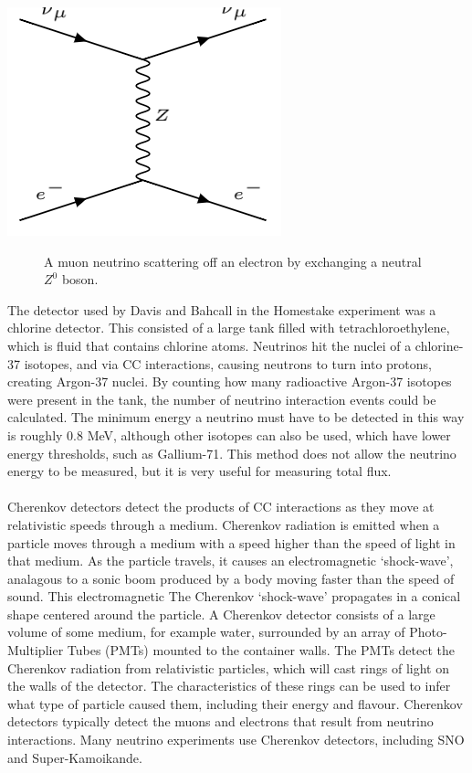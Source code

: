 \documentclass[12pt]{article}
\begin{document}
\begin{center}
\includegraphics[scale=0.4]{NC.png}
\begin{figure}[h!]
\caption{A muon neutrino scattering off an electron by exchanging a neutral $Z^0$ boson.}
\label{fig:NC}
\end{figure}
\end{center}
The detector used by Davis and Bahcall in the Homestake experiment was a chlorine detector. This consisted of a large tank filled with tetrachloroethylene, which is fluid that contains chlorine atoms. Neutrinos hit the nuclei of a chlorine-37 isotopes, and via CC interactions, causing neutrons to turn into protons, creating Argon-37 nuclei. By counting how many radioactive Argon-37 isotopes were present in the tank, the number of neutrino interaction events could be calculated\cite{Homestake}. The minimum energy a neutrino must have to be detected in this way is roughly 0.8 MeV, although other isotopes can also be used, which have lower energy thresholds, such as Gallium-71. This method does not allow the neutrino energy to be measured, but it is very useful for measuring total flux.\\\\
Cherenkov detectors detect the products of CC interactions as they move at relativistic speeds through a medium. Cherenkov radiation is emitted when a particle moves through a medium with a speed higher than the speed of light in that medium. As the particle travels, it causes an electromagnetic `shock-wave', analagous to a sonic boom produced by a body moving faster than the speed of sound. This electromagnetic The Cherenkov `shock-wave' propagates in a conical shape centered around the particle. A Cherenkov detector consists of a large volume of some medium, for example water, surrounded by an array of Photo-Multiplier Tubes (PMTs) mounted to the container walls. The PMTs detect the Cherenkov radiation from relativistic particles, which will cast rings of light on the walls of the detector. The characteristics of these rings can be used to infer what type of particle caused them, including their energy and flavour\cite{leo}. Cherenkov detectors typically detect the muons and electrons that result from neutrino interactions. Many neutrino experiments use Cherenkov detectors, including SNO and Super-Kamoikande.\\\\
\end{document}
